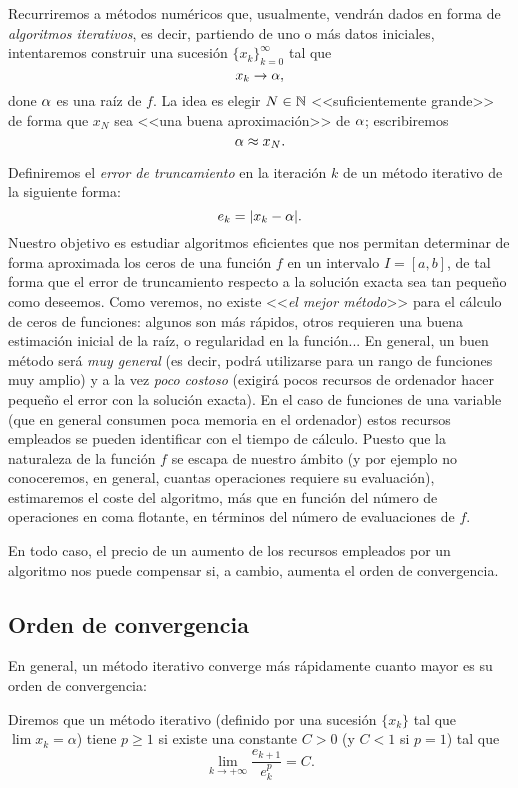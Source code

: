 Recurriremos a métodos numéricos que, usualmente, vendrán dados en
forma de \textit{algoritmos iterativos}, es decir, partiendo de uno o
más datos iniciales, intentaremos construir una sucesión
$\{x_k\}_{k=0}^{\infty}$ tal que
$$
x_k \to \alpha,
$$
done $\alpha$ es una raíz de $f$. La idea es elegir $N\in\operatorname{{\mathbb N}}$
<<suficientemente grande>> de forma que $x_N$ sea <<una buena
aproximación>> de $\alpha$; escribiremos
$$
\alpha\approx x_N.
$$

Definiremos el \emph{error de truncamiento} en la iteración $k$ de un método iterativo de la siguiente forma:
$$
e_k = |x_k-\alpha|.
$$
Nuestro objetivo es estudiar algoritmos eficientes que nos permitan
determinar de forma aproximada los ceros de una función $f$ en un
intervalo $I=[a,b]$, de tal forma que el error de truncamiento
respecto a la solución exacta sea tan pequeño como deseemos. Como
veremos, no existe <<\textit{el mejor método}>> para el cálculo de
ceros de funciones: algunos son más rápidos, otros requieren una buena
estimación inicial de la raíz, o regularidad en la función... En
general, un buen método será \emph{muy general} (es decir, podrá
utilizarse para un rango de funciones muy amplio) y a la vez
\emph{poco costoso} (exigirá pocos recursos de ordenador hacer pequeño
el error con la solución exacta). En el caso de funciones de una
variable (que en general consumen poca memoria en el ordenador) estos
recursos empleados se pueden identificar con el tiempo de cálculo.
Puesto que la naturaleza de la función $f$ se escapa de nuestro ámbito
(y por ejemplo no conoceremos, en general, cuantas operaciones
requiere su evaluación), estimaremos el coste del algoritmo, más que
en función del número de operaciones en coma flotante, en términos del
número de evaluaciones de $f$.

En todo caso, el precio de un aumento de los recursos empleados por un
algoritmo nos puede compensar si, a cambio, aumenta el orden de
convergencia.

\subsection*{Orden de convergencia}

En general, un método iterativo converge más rápidamente cuanto mayor
es su orden de convergencia:

\begin{definition}
  \label{def:orden-convergencia}
  Diremos que un método iterativo (definido por una sucesión $\{x_k\}$
  tal que $\lim x_k=\alpha$) tiene  $p\ge 1$ si existe una constante $C>0$ (y
  $C<1$ si $p=1$) tal que
  \begin{equation}
    \label{eq:orden-convergencia}
    \lim_{k\to+\infty} \frac{e_{k+1}}{e_k^p} = C.
  \end{equation}
\end{definition}

